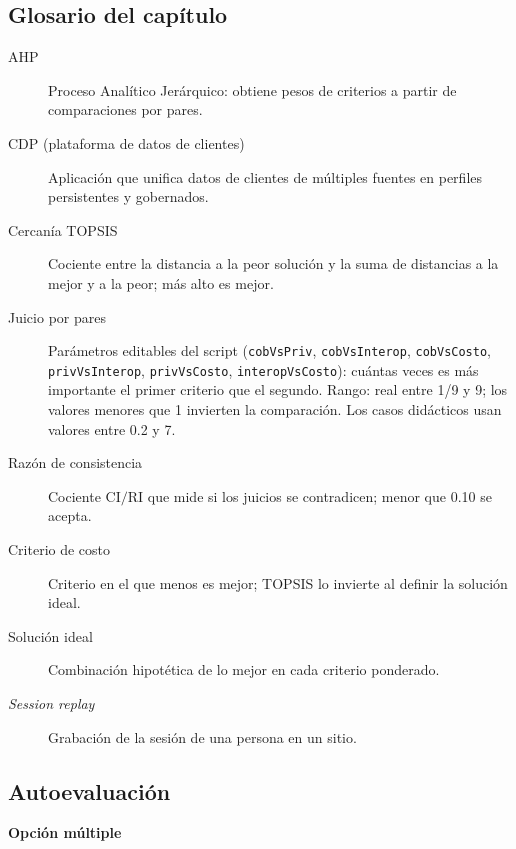 \subsection*{Glosario del capítulo}
\begin{description}
  \item[AHP] Proceso Analítico Jerárquico: obtiene pesos de criterios a partir de comparaciones por pares.
  \item[CDP (plataforma de datos de clientes)] Aplicación que unifica datos de clientes de múltiples fuentes en perfiles persistentes y gobernados.
  \item[Cercanía TOPSIS] Cociente entre la distancia a la peor solución y la suma de distancias a la mejor y a la peor; más alto es mejor.
  \item[Juicio por pares] Parámetros editables del script (\texttt{cobVsPriv}, \texttt{cobVsInterop}, \texttt{cobVsCosto}, \texttt{privVsInterop}, \texttt{privVsCosto}, \texttt{interopVsCosto}): cuántas veces es más importante el primer criterio que el segundo. Rango: real entre 1/9 y 9; los valores menores que 1 invierten la comparación. Los casos didácticos usan valores entre 0.2 y 7.
  \item[Razón de consistencia] Cociente $\mathrm{CI}/\mathrm{RI}$ que mide si los juicios se contradicen; menor que 0.10 se acepta.
  \item[Criterio de costo] Criterio en el que menos es mejor; TOPSIS lo invierte al definir la solución ideal.
  \item[Solución ideal] Combinación hipotética de lo mejor en cada criterio ponderado.
  \item[\textit{Session replay}] Grabación de la sesión de una persona en un sitio.
\end{description}

\subsection*{Autoevaluación}

\textbf{Opción múltiple}

